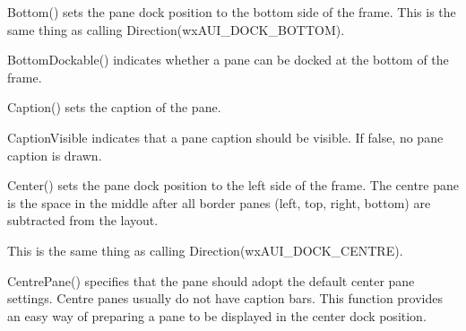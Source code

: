 \label{wxauipaneinfobottom}


Bottom() sets the pane dock position to the bottom side of the frame. This is
the same thing as calling Direction(wxAUI\_DOCK\_BOTTOM).

\label{wxauipaneinfobottomdockable}


BottomDockable() indicates whether a pane can be docked at the bottom of the frame.

\label{wxauipaneinfocaption}


Caption() sets the caption of the pane.

\label{wxauipaneinfocaptionvisible}


CaptionVisible indicates that a pane caption should be visible. If false, no pane caption is drawn.

\label{wxauipaneinfocentre}



Center() sets the pane dock position to the left side of the frame.
The centre pane is the space in the middle after all border panes (left, top, right, bottom) are subtracted from the layout.

This is the same thing as calling Direction(wxAUI\_DOCK\_CENTRE). 

\label{wxauipaneinfocentrepane}



CentrePane() specifies that the pane should adopt the default center pane settings. Centre panes usually do not have caption bars. This function provides an easy way of preparing a pane to be displayed in the center dock position.

\label{wxauipaneinfoclosebutton}

